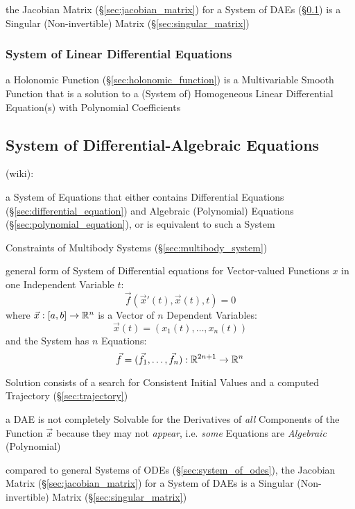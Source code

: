 \fist the Jacobian Matrix (\S\ref{sec:jacobian_matrix}) for a System of DAEs
(\S\ref{sec:system_of_daes}) is a Singular (Non-invertible) Matrix
(\S\ref{sec:singular_matrix})



\subsubsection{System of Linear Differential Equations}
\label{sec:system_of_linear_odes}

a Holonomic Function (\S\ref{sec:holonomic_function}) is a Multivariable Smooth
Function that is a solution to a (System of) Homogeneous Linear Differential
Equation(s) with Polynomial Coefficients



\subsection{System of Differential-Algebraic Equations}
\label{sec:system_of_daes}

(wiki):

a System of Equations that either contains Differential Equations
(\S\ref{sec:differential_equation}) and Algebraic (Polynomial) Equations
(\S\ref{sec:polynomial_equation}), or is equivalent to such a System

\fist Constraints of Multibody Systems (\S\ref{sec:multibody_system})

general form of System of Differential equations for Vector-valued Functions
$x$ in one Independent Variable $t$:
\[
  \vec{f}(\vec{x}'(t), \vec{x}(t), t) = 0
\]
where $\vec{x} : [a,b] \rightarrow \mathbb{R}^n$ is a Vector of $n$ Dependent
Variables:
\[
  \vec{x}(t) = (x_1(t), \ldots, x_n(t))
\]
and the System has $n$ Equations:
\[
  \vec{f} = (\vec{f}_1, \ldots, \vec{f}_n) : \mathbb{R}^{2n+1} \rightarrow \mathbb{R}^n
\]

Solution consists of a search for Consistent Initial Values and a computed
Trajectory (\S\ref{sec:trajectory})

a DAE is not completely Solvable for the Derivatives of \emph{all} Components
of the Function $\vec{x}$ because they may not \emph{appear}, i.e. \emph{some}
Equations are \emph{Algebraic} (Polynomial)

compared to general Systems of ODEs (\S\ref{sec:system_of_odes}), the Jacobian
Matrix (\S\ref{sec:jacobian_matrix}) for a System of DAEs is a Singular
(Non-invertible) Matrix (\S\ref{sec:singular_matrix})

